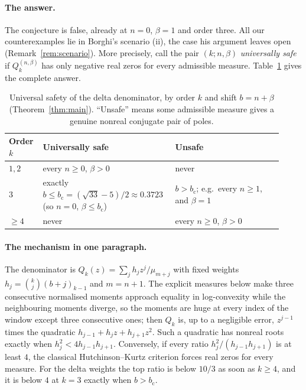 \documentclass[11pt,a4paper]{article}
\theoremstyle{definition}
\theoremstyle{remark}
\newcommand{\bc}{b_{\mathrm c}}
\begin{document}
\paragraph{The answer.}
The conjecture is false, already at $n=0$, $\beta=1$ and order three. All
our counterexamples lie in Borghi's scenario (ii), the case his argument
leaves open (Remark~\ref{rem:scenario}). More precisely, call the pair
$(k;n,\beta)$ \emph{universally safe} if $Q_k^{(n,\beta)}$ has only negative
real zeros for every admissible measure. Table~\ref{tab:classification}
gives the complete answer.

\begin{table}[htbp]
\centering
\caption{Universal safety of the delta denominator, by order $k$ and shift
$b=n+\beta$ (Theorem~\ref{thm:main}). ``Unsafe'' means some admissible
measure gives a genuine nonreal conjugate pair of poles.}
\label{tab:classification}
\begin{tabular}{@{}p{0.12\linewidth}p{0.42\linewidth}p{0.38\linewidth}@{}}
\toprule
Order $k$ & Universally safe & Unsafe\\
\midrule
$1,2$ & every $n\ge0$, $\beta>0$ & never\\
$3$ & exactly $b\le\bc=(\sqrt{33}-5)/2\approx0.3723$ (so $n=0$, $\beta\le\bc$) & $b>\bc$; e.g.\ every $n\ge1$, and $\beta=1$\\
$\ge4$ & never & every $n\ge0$, $\beta>0$\\
\bottomrule
\end{tabular}
\end{table}

\paragraph{The mechanism in one paragraph.}
The denominator is $Q_k(z)=\sum_j h_j z^j/\mu_{m+j}$ with fixed weights
$h_j=\binom kj(b+j)_{k-1}$ and $m=n+1$. The explicit measures below make three consecutive normalised moments
approach equality in log-convexity while the neighbouring moments diverge,
so the moments are huge at every index of the window except three
consecutive ones; then $Q_k$ is, up to a negligible error, $z^{j-1}$ times the quadratic
$h_{j-1}+h_jz+h_{j+1}z^2$. Such a quadratic has nonreal roots exactly when
$h_j^2<4h_{j-1}h_{j+1}$. Conversely, if every ratio
$h_j^2/(h_{j-1}h_{j+1})$ is at least $4$, the classical
Hutchinson--Kurtz criterion forces real zeros for every measure. For the
delta weights the top ratio is below $10/3$ as soon as $k\ge4$, and it is
below $4$ at $k=3$ exactly when $b>\bc$.
\end{document}
